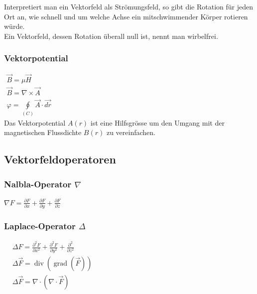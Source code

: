 Interpretiert man ein Vektorfeld als Strömungsfeld, so gibt die Rotation für jeden Ort an, 
wie schnell und um welche Achse ein mitschwimmender Körper rotieren würde.\\
Ein Vektorfeld, dessen Rotation überall null ist, nennt man wirbelfrei.\\

\subsubsection{Vektorpotential}
$\boxed{\begin{array}{c}
    \vec{B}=\mu \vec{H}\\
\vec{B}=\nabla\times \vec{A}\\
\varphi=\oint\limits_{(C)}\vec{A}\cdot \vec{dr}
\end{array}}$\\

Das Vektorpotential $A(r)$ ist eine Hilfsgrösse um den Umgang mit der magnetischen Flussdichte $B(r)$ zu vereinfachen.

\subsection{Vektorfeldoperatoren}
\begin{minipage}[t]{0.48\columnwidth}
    \subsubsection{Nalbla-Operator $\nabla$}
    $\boxed{\nabla F=\frac{\partial F}{\partial x}+\frac{\partial F}{\partial y}+\frac{\partial F}{\partial z}}$
\end{minipage}
\hfill
\begin{minipage}[t]{0.48\columnwidth}
    \subsubsection{Laplace-Operator $\Delta$}
    $\boxed{\begin{aligned}
        &\Delta F=\frac{\partial^2F}{\partial x^2}+
        \frac{\partial^2F}{\partial y^2}+
        \frac{\partial^2}{\partial z^2}\\
        &\Delta\vec{F}=\operatorname{div}(\operatorname{grad}(\vec{F}))\\
        &\Delta\vec{F}=\nabla\cdot(\nabla\cdot\vec{F})
    \end{aligned}}$\\\\
\end{minipage}

